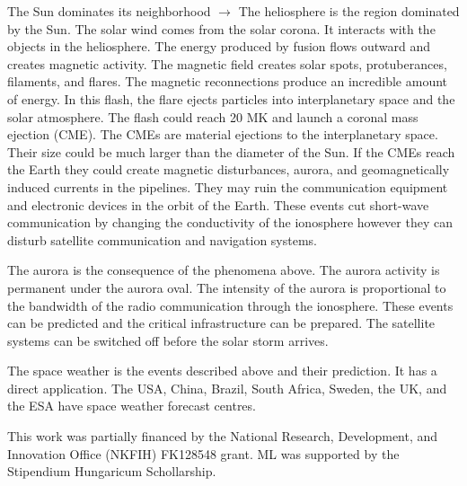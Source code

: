 \documentclass[sn-aps]{sn-jnl}%
\begin{document}
The Sun dominates its neighborhood $\rightarrow$ The heliosphere is the region dominated by the Sun. The solar wind comes from the solar corona. It interacts with the objects in the heliosphere. The energy produced by fusion flows outward and creates magnetic activity. The magnetic field creates solar spots, protuberances, filaments, and flares. The magnetic reconnections produce an incredible amount of energy. In this flash, the flare ejects particles into interplanetary space and the solar atmosphere. The flash could reach 20 MK and launch a coronal mass ejection (CME). The CMEs are material ejections to the interplanetary space. Their size could be much larger than the diameter of the Sun. If the CMEs reach the Earth they could create magnetic disturbances, aurora, and geomagnetically induced currents in the pipelines. They may ruin the communication equipment and electronic devices in the orbit of the Earth. These events cut short-wave communication by changing the conductivity of the ionosphere however they can disturb satellite communication and navigation systems.

The aurora is the consequence of the phenomena above. The aurora activity is permanent under the aurora oval. The intensity of the aurora is proportional to the bandwidth of the radio communication through the ionosphere. These events can be predicted and the critical infrastructure can be prepared. The satellite systems can be switched off
before the solar storm arrives.

The space weather is the events described above and their prediction. It has a direct application. The USA, China, Brazil, South Africa, Sweden, the UK, and the ESA have space weather forecast centres.

\backmatter


This work was partially financed by the National Research, Development, and Innovation Office (NKFIH) FK128548 grant. ML was supported by the Stipendium Hungaricum Schollarship. 

\vfill


\pagebreak

%


\end{document}
